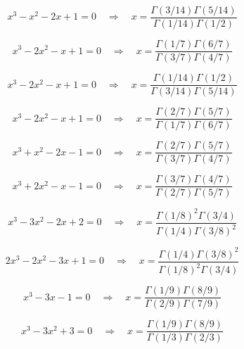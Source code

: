 \documentclass[11pt,a4paper]{article}
\begin{document}
\begin{equation}\label{eq:38}
x^{3} - x^{2} - 2x + 1 = 0 \quad \Rightarrow \quad x = \frac{\Gamma(3/14)\Gamma(5/14)}{\Gamma(1/14)\Gamma(1/2)}
\end{equation}

\begin{equation}\label{eq:39}
x^{3} - 2x^{2} - x + 1 = 0 \quad \Rightarrow \quad x = \frac{\Gamma(1/7)\Gamma(6/7)}{\Gamma(3/7)\Gamma(4/7)}
\end{equation}

\begin{equation}\label{eq:40}
x^{3} - 2x^{2} - x + 1 = 0 \quad \Rightarrow \quad x = \frac{\Gamma(1/14)\Gamma(1/2)}{\Gamma(3/14)\Gamma(5/14)}
\end{equation}

\begin{equation}\label{eq:41}
x^{3} - 2x^{2} - x + 1 = 0 \quad \Rightarrow \quad x = \frac{\Gamma(2/7)\Gamma(5/7)}{\Gamma(1/7)\Gamma(6/7)}
\end{equation}

\begin{equation}\label{eq:42}
x^{3} + x^{2} - 2x - 1 = 0 \quad \Rightarrow \quad x = \frac{\Gamma(2/7)\Gamma(5/7)}{\Gamma(3/7)\Gamma(4/7)}
\end{equation}

\begin{equation}\label{eq:43}
x^{3} + 2x^{2} - x - 1 = 0 \quad \Rightarrow \quad x = \frac{\Gamma(3/7)\Gamma(4/7)}{\Gamma(2/7)\Gamma(5/7)}
\end{equation}

\begin{equation}\label{eq:44}
x^{3} - 3x^{2} - 2x + 2 = 0 \quad \Rightarrow \quad x = \frac{\Gamma(1/8)^2\Gamma(3/4)}{\Gamma(1/4)\Gamma(3/8)^2}
\end{equation}

\begin{equation}\label{eq:45}
2x^{3} - 2x^{2} - 3x + 1 = 0 \quad \Rightarrow \quad x = \frac{\Gamma(1/4)\Gamma(3/8)^2}{\Gamma(1/8)^2\Gamma(3/4)}
\end{equation}

\begin{equation}\label{eq:46}
x^{3} - 3x - 1 = 0 \quad \Rightarrow \quad x = \frac{\Gamma(1/9)\Gamma(8/9)}{\Gamma(2/9)\Gamma(7/9)}
\end{equation}

\begin{equation}\label{eq:47}
x^{3} - 3x^{2} + 3 = 0 \quad \Rightarrow \quad x = \frac{\Gamma(1/9)\Gamma(8/9)}{\Gamma(1/3)\Gamma(2/3)}
\end{equation}
\end{document}
